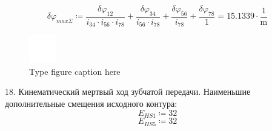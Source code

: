 \documentclass{article}
\newcommand{\defeq}{\coloneq} %
\begin{document}
\begin{equation*}
δφ_{maxΣ} \defeq \frac{\textit{δφ}_{\textit{12}}}{\textit{i}_{\textit{34}} \cdot \textit{i}_{\textit{56}} \cdot \textit{i}_{\textit{78}}}+\frac{\textit{δφ}_{\textit{34}}}{\textit{i}_{\textit{56}} \cdot \textit{i}_{\textit{78}}}+\frac{\textit{δφ}_{\textit{56}}}{\textit{i}_{\textit{78}}}+\frac{\textit{δφ}_{\textit{78}}}{1} = {15.1339 \cdot \frac{1}{\mathrm{m}}}
\end{equation*}
\begin{figure}[h!]
 \begin{center}
  \includegraphics[max width=\textwidth]{calculations/834.png}
  \caption{Type figure caption here}
  \label{fig:834}
 \end{center}
\end{figure}
\colorbox[HTML]{000000}{18. Кинематический мертвый ход зубчатой передачи.}\newline
\colorbox[HTML]{000000}{Наименьшие дополнительные смещения исходного контура:}\newline
\begin{equation*}
\textit{E}_{\textit{HS1}} \defeq 32
\end{equation*}
\begin{equation*}
\textit{E}_{\textit{HS5}} \defeq 32
\end{equation*}
\end{document}
